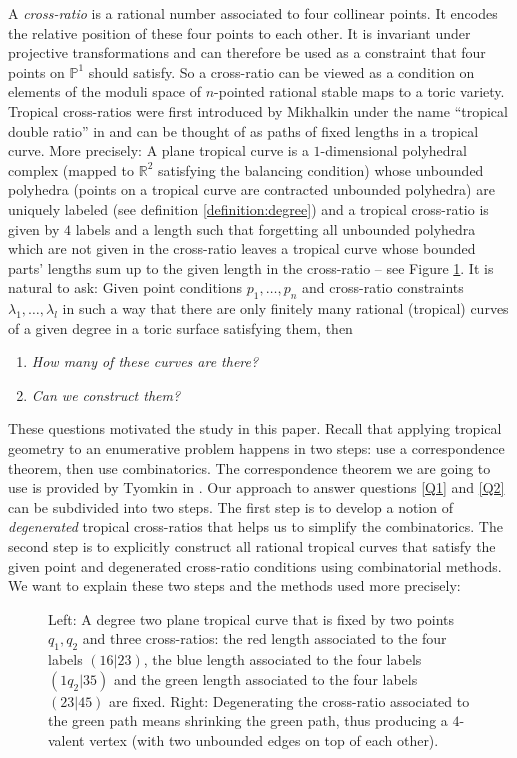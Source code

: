 \documentclass[11pt,reqno,a4]{amsart}
\theoremstyle{dotless}
\theoremstyle{definition}
\begin{document}
A \textit{cross-ratio} is a rational number associated to four collinear points. It encodes the relative position of these four points to each other. It is invariant under projective transformations and can therefore be used as a constraint that four points on $\mathbb{P}^1$ should satisfy. So a cross-ratio can be viewed as a condition on elements of the moduli space of $n$-pointed rational stable maps to a toric variety. Tropical cross-ratios were first introduced by Mikhalkin under the name ``tropical double ratio'' in \cite{MikhalkinCRC} and can be thought of as paths of fixed lengths in a tropical curve. More precisely: A plane tropical curve is a $1$-dimensional polyhedral complex (mapped to $\mathbb{R}^2$ satisfying the balancing condition) whose unbounded polyhedra (points on a tropical curve are contracted unbounded polyhedra) are uniquely labeled (see definition \ref{definition:degree}) and a tropical cross-ratio is given by $4$ labels and a length such that forgetting all unbounded polyhedra which are not given in the cross-ratio leaves a tropical curve whose bounded parts' lengths sum up to the given length in the cross-ratio -- see Figure \ref{Example_Introduction}. It is natural to ask: Given point conditions $p_1,\dots,p_n$ and cross-ratio constraints $\lambda_1,\dots,\lambda_l$ in such a way that there are only finitely many rational (tropical) curves of a given degree in a toric surface satisfying them, then
\begin{enumerate}[label=(\arabic*),ref=(\arabic*)]
\item \label{Q1} \textit{How many of these curves are there?}
\item \label{Q2} \textit{Can we construct them?}
\end{enumerate}
These questions motivated the study in this paper. Recall that applying tropical geometry to an enumerative problem happens in two steps: use a correspondence theorem, then use combinatorics. The correspondence theorem we are going to use is provided by Tyomkin in \cite{IlyaCRC}. Our approach to answer questions \ref{Q1} and \ref{Q2} can be subdivided into two steps. The first step is to develop a notion of \textit{degenerated} tropical cross-ratios that helps us to simplify the combinatorics. The second step is to explicitly construct all rational tropical curves that satisfy the given point and degenerated cross-ratio conditions using combinatorial methods. We want to explain these two steps and the methods used more precisely:

\begin{figure}
\centering
\def\svgwidth{300pt}

\caption{Left: A degree two plane tropical curve that is fixed by two points $q_1,q_2$ and three cross-ratios: the red length associated to the four labels $(16|23)$, the blue length associated to the four labels $(1q_2|35)$ and the green length associated to the four labels $(23|45)$ are fixed. Right: Degenerating the cross-ratio associated to the green path means shrinking the green path, thus producing a $4$-valent vertex (with two unbounded edges on top of each other).}
\label{Example_Introduction}
\end{figure}
\end{document}
